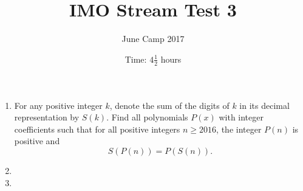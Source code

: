 \documentclass{article}
\title{IMO Stream Test 3}
\author{June Camp 2017}
\date{Time: $4\frac{1}{2}$ hours}
\begin{document}
 \maketitle

\begin{enumerate}

\item %
	For any positive integer $k$, denote the sum of the digits of $k$ in its decimal representation by $S(k)$. Find all polynomials $P(x)$ with integer coefficients such that for all positive integers $n \geq 2016$, the integer $P(n)$ is positive and \[S(P(n)) = P(S(n)).\]

\item %
	

\item %
	

\end{enumerate}
\end{document}
